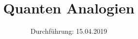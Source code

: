 

\subject{V23}
\title{Quanten Analogien}
\date{%
  Durchführung: 15.04.2019
}



\maketitle
\thispagestyle{empty}
\tableofcontents
\newpage


\newpage





\printbibliography{}



